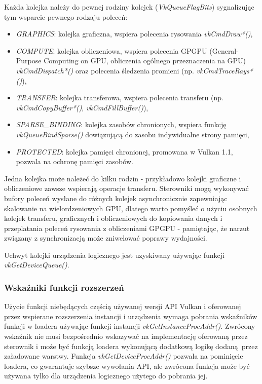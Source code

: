 Każda kolejka należy do pewnej rodziny kolejek (\textit{VkQueueFlagBits}) sygnalizując tym wsparcie pewnego rodzaju poleceń:
\begin{itemize}
	\item \textit{GRAPHICS}: kolejka graficzna, wspiera polecenia rysowania \textit{vkCmdDraw*()},
	\item \textit{COMPUTE}: kolejka obliczeniowa, wspiera polecenia GPGPU (General-Purpose Computing on GPU, obliczenia ogólnego przeznaczenia na GPU) \textit{vkCmdDispatch*()} oraz polecenia śledzenia promieni (np. \textit{vkCmdTraceRays*()}),
	\item \textit{TRANSFER}: kolejka transferowa, wspiera polecenia transferu (np. \textit{vkCmdCopyBuffer*()}, \textit{vkCmdFillBuffer()}),
	\item \textit{SPARSE\_BINDING}: kolejka zasobów chronionych, wspiera funkcję \textit{vkQueueBindSparse()} dowiązującą do zasobu indywidualne strony pamięci,
	\item \textit{PROTECTED}: kolejka pamięci chronionej, promowana w Vulkan 1.1, pozwala na ochronę pamięci zasobów.
\end{itemize}
Jedna kolejka może należeć do kilku rodzin - przykładowo kolejki graficzne i obliczeniowe zawsze wspierają operacje transferu.
Sterowniki mogą wykonywać bufory poleceń wysłane do różnych kolejek asynchronicznie zapewniając skalowanie na wielordzeniowych GPU, dlatego warto pomyśleć o użyciu osobnych kolejek transferu, graficznych i obliczeniowych do kopiowania danych i przeplatania poleceń rysowania z obliczeniami GPGPU - pamiętając, że narzut związany z synchronizacją może zniwelować poprawy wydajności.

Uchwyt kolejki urządzenia logicznego jest uzyskiwany używając funkcji \textit{vkGetDeviceQueue()}.


\subsubsection{Wskaźniki funkcji rozszerzeń}

Użycie funkcji niebędących częścią używanej wersji API Vulkan i oferowanej przez wspierane rozszerzenia instancji i urządzenia wymaga pobrania wskaźników funkcji w loadera używając funkcji instancji \textit{vkGetInstanceProcAddr()}.
Zwrócony wskaźnik nie musi bezpośrednio wskazywać na implementację oferowaną przez sterownik i może być funkcją loadera wykonującą dodatkową logikę dodaną przez załadowane warstwy.
Funkcja \textit{vkGetDeviceProcAddr()} pozwala na pominięcie loadera, co gwarantuje szybsze wywołania API, ale zwrócona funkcja może być używana tylko dla urządzenia logicznego użytego do pobrania jej.

